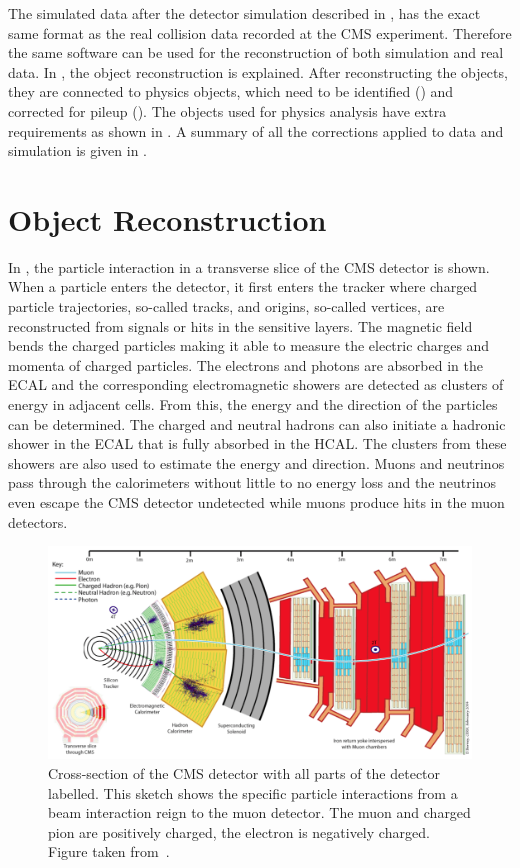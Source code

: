 The simulated data after the detector simulation described in , has the exact same format as the real collision data recorded at the CMS experiment. Therefore the same software can be used for the reconstruction of both simulation and real data. In , the object reconstruction is explained. After reconstructing the objects, they are connected to physics objects, which need to be identified () and corrected for pileup (). The objects used for physics analysis have extra requirements as shown in . A summary of all the corrections applied to data and simulation is given in .

\section{Object Reconstruction}
\label{sec:reco}
In , the particle interaction in a transverse slice of the CMS detector is shown. When a particle enters the detector, it first enters the tracker where charged particle trajectories, so-called tracks, and origins, so-called vertices, are reconstructed from signals or hits in the sensitive layers. The  magnetic field bends the charged particles making it able to measure the electric charges and momenta of charged particles. The electrons and photons are absorbed in the ECAL and the corresponding electromagnetic showers are detected as clusters of energy in adjacent cells. From this, the energy and the direction of the particles can be determined. The charged and neutral hadrons can also initiate a hadronic shower in the ECAL that is fully absorbed in the HCAL. The clusters from these showers are also used to estimate the energy and direction. Muons and neutrinos pass through the calorimeters without little to no energy loss and the neutrinos even escape the CMS detector undetected while muons produce hits in the muon detectors. 
\begin{landscape}
\begin{figure}
	\centering
	\includegraphics[width=1.\linewidth]{4_EventRecoSelect/Figures/transversecms}
	\caption{Cross-section of the CMS detector with all parts of the detector labelled. This sketch shows the specific particle interactions from a beam interaction reign to the muon detector. The muon and charged pion are positively charged, the electron is negatively charged. Figure taken from~\cite{CMS-PRF-14-001}. }
	\label{fig:transversecms}
\end{figure}
\end{landscape}
